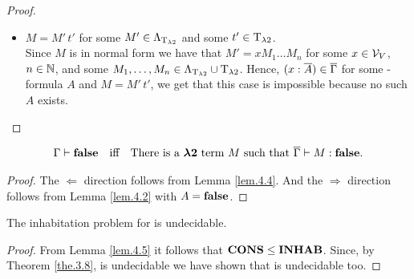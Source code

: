 \begin{proof}
\begin{itemize}
	\item[] \underline{$M=M'\,t'$} for some $M'\in\Lambda_{\text{T}_{\lambda2}}$ and some $t'\in\text{T}_{\lambda2}$.\\
		Since $M$ is in normal form we have that $M'=xM_1\dots M_n$ for some $x\in\mathcal{V}_V$, $n\in\mathbb{N}$, and some $M_1,\dots,M_n\in\Lambda_{\text{T}_{\lambda2}}\cup\text{T}_{\lambda2}$.
		Hence, $(x:\overline{A})\in\overline{\Gamma}$ for some \SysP-formula $A$ and $M=M'\,t'$, we get that this case is impossible because no such $A$ exists.
		
		
		
\end{itemize}
\end{proof}

\begin{lemma}\label{lem.4.5}
\begin{align*}
\Gamma\vdash\textbf{false}&&\text{iff}&&\text{There is a $\boldsymbol{\lambda2}$ term $M$ such that } \overline{\Gamma}\vdash M:\textbf{false}.
\end{align*}
\end{lemma}
\begin{proof}
The $\Leftarrow$ direction follows from Lemma \ref{lem.4.4}. And the $\Rightarrow$ direction follows from Lemma \ref{lem.4.2} with $A=\textbf{false}$.
\end{proof}

\begin{theorem}\label{the.4.6}
The inhabitation problem for \lambdaTwo{} is undecidable.
\end{theorem}
\begin{proof}
From Lemma \ref{lem.4.5} it follows that $\textbf{CONS}\leq\textbf{INHAB}$. Since, by Theorem \ref{the.3.8}, \PCons{} is undecidable we have shown that \lambdaInhab{} is undecidable too.
\end{proof}